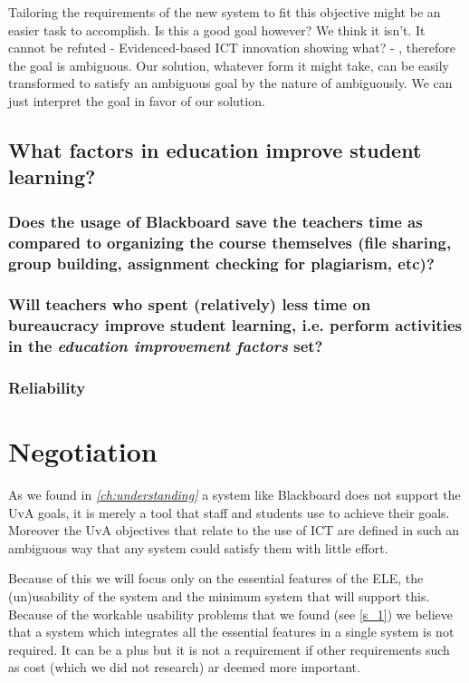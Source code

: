 Tailoring the requirements of the new system to fit this objective might be an easier task to accomplish. Is this a good goal however? We think it isn't. It cannot be refuted - Evidenced-based ICT innovation showing what? - , therefore the goal is ambiguous. Our solution, whatever form it might take, can be easily transformed to satisfy an ambiguous goal by the nature of ambiguously. We can just interpret the goal in favor of our solution. 


\section{What factors in education improve student learning?}

\subsection{Does the usage of Blackboard save the teachers time as compared to organizing the course themselves (file sharing, group building, assignment checking for plagiarism, etc)?}
\label{ss_1}



\subsection{Will teachers who spent (relatively) less time on bureaucracy improve student learning, i.e. perform activities in the \textit{education improvement factors} set?}
\label{ss_2}

\subsection{Reliability}


\chapter{Negotiation}
As we found in \emph{\ref{ch:understanding} } a system like Blackboard does not support the UvA goals, it is merely a tool that staff and students use to achieve their goals. Moreover the UvA objectives that relate to the use of ICT are defined in such an ambiguous way that any system could satisfy them with little effort.

Because of this we will focus only on the essential features of the ELE, the (un)usability of the system and the minimum system that will support this. Because of the workable usability problems that we found (see \ref{s_1}) we believe that a system which integrates all the essential features in a single system is not required. It can be a plus but it is not a requirement if other requirements such as cost (which we did not research) ar deemed more important.


